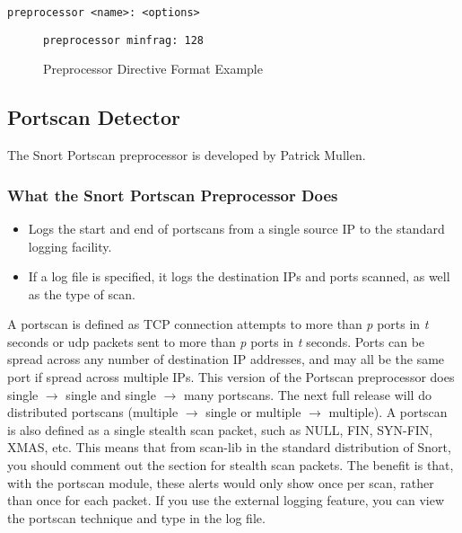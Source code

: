 \documentclass[english]{report}
\begin{document}
\begin{verbatim}
preprocessor <name>: <options>
\end{verbatim}

\begin{figure}[!hbpt]
\begin{verbatim}
preprocessor minfrag: 128
\end{verbatim}

\caption{\label{Preprocessor Example}Preprocessor Directive Format Example}
\end{figure}

\subsection{Portscan Detector}

The Snort Portscan preprocessor is developed by Patrick Mullen.


\subsubsection{What the Snort Portscan Preprocessor Does}

\begin{itemize}
\item Logs the start and end of portscans from a single source IP to the
standard logging facility.
\item If a log file is specified, it logs the destination IPs and ports scanned,
as well as the type of scan.
\end{itemize}
A portscan is defined as TCP connection attempts to more than {\em p} ports
in {\em t} seconds or udp packets sent to more than {\em p} ports in {\em t} seconds.
Ports can be spread across any number of destination IP addresses,
and may all be the same port if spread across multiple IPs. This version of the Portscan
preprocessor
does single $\rightarrow$ single and single $\rightarrow$ many portscans. The next full release
will do distributed portscans (multiple $\rightarrow$ single or multiple $\rightarrow$ multiple).
A portscan is also defined as a single stealth scan
packet, such as NULL, FIN, SYN-FIN, XMAS, etc. This means that from
scan-lib in the standard distribution of Snort, you should comment
out the section for stealth scan packets. The benefit is that, with the
portscan module, these alerts would only show once per scan, rather
than once for each packet. If you use the external logging feature,
you can view the portscan technique and type in the log file.
\end{document}
